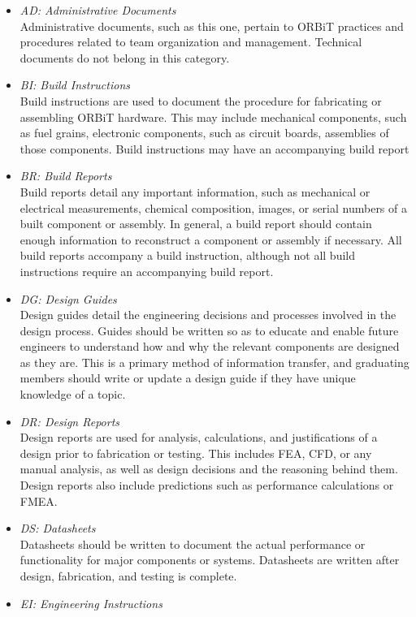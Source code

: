 \documentclass[12pt,article]{memoir}
\begin{document}
\begin{itemize}
\item \textit{AD: Administrative Documents}\\
Administrative documents, such as this one, pertain to ORBiT practices and procedures related to team organization and management. Technical documents do not belong in this category.
\item \textit{BI: Build Instructions}\\
Build instructions are used to document the procedure for fabricating or assembling ORBiT hardware. This may include mechanical components, such as fuel grains, electronic components, such as circuit boards, assemblies of those components. Build instructions may have an accompanying build report
\item \textit{BR: Build Reports}\\
Build reports detail any important information, such as mechanical or electrical measurements, chemical composition, images, or serial numbers of a built component or assembly. In general, a build report should contain enough information to reconstruct a component or assembly if necessary. All build reports accompany a build instruction, although not all build instructions require an accompanying build report.
\item \textit{DG: Design Guides}\\
Design guides detail the engineering decisions and processes involved in the design process. Guides should be written so as to educate and enable future engineers to understand how and why the relevant components are designed as they are. This is a primary method of information transfer, and graduating members should write or update a design guide if they have unique knowledge of a topic.
\item \textit{DR: Design Reports}\\
Design reports are used for analysis, calculations, and justifications of a design prior to fabrication or testing. This includes FEA, CFD, or any manual analysis, as well as design decisions and the reasoning behind them. Design reports also include predictions such as performance calculations or FMEA.
\item \textit{DS: Datasheets}\\
Datasheets should be written to document the actual performance or functionality for major components or systems. Datasheets are written after design, fabrication, and testing is complete.
\item \textit{EI: Engineering Instructions}\\

\end{itemize}
\end{document}
